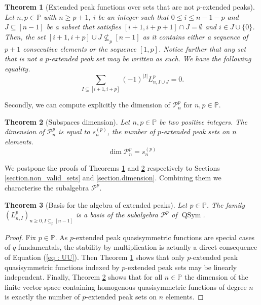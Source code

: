\documentclass[submission]{FPSAC2023}
\newtheorem{theorem}{Theorem}
\newcommand{\PP}{\mathbb{P}} %
\newcommand{\QSym}{\operatorname{QSym}}
\begin{document}
%
\begin{theorem}[Extended peak functions over sets that are not $p$-extended peaks] 
\label{thm.non_valid_sets}
Let $n, p \in \PP$ with $n \geq p+1$, $i$ be an integer such that $0 \leq i \leq n - 1 -p$ and $J \subseteq [n-1]$ be a subset that satisfies $[i+1,i+p+1] \cap J = \emptyset$ and $i \in J \cup \{0\}$. Then, the set $ [i+1,i+p] \cup J \nsubseteq_p [n-1]$ as it contains either a sequence of $p+1$ consecutive elements or the sequence $[1,p]$. Notice further that any set that is not a $p$-extended peak set may be written as such. We have the following equality.
\begin{equation*}
\sum_{I \subseteq [i+1, i+p]}(-1)^{|I|}L^p_{n, I \cup J} = 0.
\end{equation*}
\end{theorem}
%
Secondly, we can compute explicitly the dimension of $\mathcal{P}^p_n$ for $n, p \in \PP$.
% 
\begin{theorem}[Subspaces dimension]
\label{thm.dimension}
Let $n, p \in \PP$ be two positive integers. The dimension of $\mathcal{P}^p_n$ is equal to $s^{(p)}_n$, the number of $p$-extended peak sets on $n$ elements.
\begin{equation*}
\dim \mathcal{P}^p_n = s^{(p)}_n
\end{equation*}
\end{theorem}
%
We postpone the proofs of Theorems \ref{thm.non_valid_sets} and \ref{thm.dimension} respectively to Sections \ref{section.non_valid_sets} and \ref{section.dimension}. Combining them we characterise the subalgebra $\mathcal{P}^p$. 
%
\begin{theorem}[Basis for the algebra of extended peaks]
\label{thm.algebra_extended_peaks}
Let $p \in \PP$. The family $(L_{n, I}^{p})_{n\geq0, I\subseteq_p[n-1]}$ is a basis of the subalgebra $\mathcal{P}^p$ of $\QSym$.
\end{theorem}

\begin{proof}
Fix $p \in \PP$. As $p$-extended peak quasisymmetric functions are special cases of $q$-fundamentals, the stability by multiplication is actually a direct consequence of Equation (\ref{eq : UU}). Then Theorem \ref{thm.non_valid_sets} shows that only $p$-extended peak quasisymmetric functions indexed by $p$-extended peak sets may be linearly independent. Finally, Theorem \ref{thm.dimension} shows that for all $n \in \PP$ the dimension of the finite vector space containing homogenous quasisymmetric functions of degree $n$ is exactly the number of $p$-extended peak sets on $n$ elements. 
\end{proof}
\end{document}
